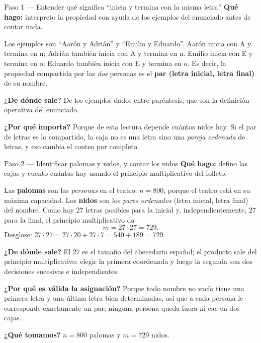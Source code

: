 \documentclass[11pt]{article}
\begin{document}
\begin{paso}{Paso 1 --- Entender qué significa ``inicia y termina con la misma letra''}
\textbf{Qué hago:} interpreto la propiedad con ayuda de los ejemplos del enunciado antes de contar nada.

Los ejemplos son ``Aarón y Adrián'' y ``Emilio y Eduardo''. Aarón inicia con \textsf{A} y termina en \textsf{n}; Adrián también inicia con \textsf{A} y termina en \textsf{n}. Emilio inicia con \textsf{E} y termina en \textsf{o}; Eduardo también inicia con \textsf{E} y termina en \textsf{o}. Es decir, la propiedad compartida por las \emph{dos} personas es el \textbf{par (letra inicial, letra final)} de su nombre.

\textbf{¿De dónde sale?} De los ejemplos dados entre paréntesis, que son la definición operativa del enunciado.

\textbf{¿Por qué importa?} Porque de esta lectura depende cuántos nidos hay. Si el par de letras es lo compartido, la caja no es una letra sino una \emph{pareja ordenada} de letras, y eso cambia el conteo por completo.
\end{paso}

\begin{paso}{Paso 2 --- Identificar palomas y nidos, y contar los nidos}
\textbf{Qué hago:} defino las cajas y cuento cuántas hay usando el principio multiplicativo del folleto.

Las \textbf{palomas} son las \emph{personas} en el teatro: $n=800$, porque el teatro está en su máxima capacidad. Los \textbf{nidos} son los \emph{pares ordenados} (letra inicial, letra final) del nombre. Como hay $27$ letras posibles para la inicial y, independientemente, $27$ para la final, el principio multiplicativo da
\[
m=27\cdot 27 = 729 .
\]
Desglose: $27\cdot 27 = 27\cdot 20+27\cdot 7 = 540+189 = 729$.

\textbf{¿De dónde sale?} El $27$ es el tamaño del abecedario español; el producto sale del principio multiplicativo: elegir la primera coordenada y luego la segunda son dos decisiones sucesivas e independientes.

\textbf{¿Por qué es válida la asignación?} Porque todo nombre no vacío tiene una primera letra y una última letra bien determinadas, así que a cada persona le corresponde exactamente un par; ninguna persona queda fuera ni cae en dos cajas.

\textbf{¿Qué tomamos?} $n=800$ palomas y $m=729$ nidos.
\end{paso}
\end{document}
